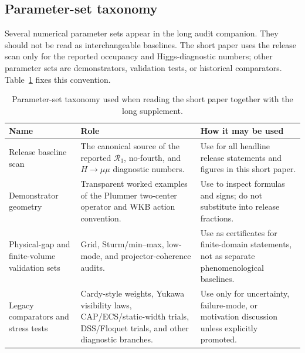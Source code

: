 \documentclass[aps,prd,onecolumn,notitlepage,nofootinbib,superscriptaddress,11pt,floatfix]{revtex4-2}
\newcommand{\Rthree}{\mathcal{R}_3}
\begin{document}
\subsection{Parameter-set taxonomy}

Several numerical parameter sets appear in the long audit companion.
They should not be read as interchangeable baselines.
The short paper uses the release scan only for the reported occupancy and Higgs-diagnostic numbers; other parameter sets are demonstrators, validation tests, or historical comparators.
Table~\ref{tab:param_taxonomy} fixes this convention.

\begin{table}[htbp]
\centering
\caption{Parameter-set taxonomy used when reading the short paper together with the long supplement.}
\label{tab:param_taxonomy}
\small
\setlength{\tabcolsep}{4pt}
\renewcommand{\arraystretch}{1.12}
\begin{tabular}{@{}l l l@{}}
\toprule
\parbox[t]{0.22\textwidth}{\textbf{Name}} & \parbox[t]{0.34\textwidth}{\textbf{Role}} & \parbox[t]{0.32\textwidth}{\textbf{How it may be used}} \\
\midrule
\parbox[t]{0.22\textwidth}{Release baseline scan} &
\parbox[t]{0.34\textwidth}{The canonical source of the reported \(\Rthree\), no-fourth, and \(H\to\mu\mu\) diagnostic numbers.} &
\parbox[t]{0.32\textwidth}{Use for all headline release statements and figures in this short paper.} \\
\parbox[t]{0.22\textwidth}{Demonstrator geometry} &
\parbox[t]{0.34\textwidth}{Transparent worked examples of the Plummer two-center operator and WKB action convention.} &
\parbox[t]{0.32\textwidth}{Use to inspect formulas and signs; do not substitute into release fractions.} \\
\parbox[t]{0.22\textwidth}{Physical-gap and finite-volume validation sets} &
\parbox[t]{0.34\textwidth}{Grid, Sturm/min--max, low-mode, and projector-coherence audits.} &
\parbox[t]{0.32\textwidth}{Use as certificates for finite-domain statements, not as separate phenomenological baselines.} \\
\parbox[t]{0.22\textwidth}{Legacy comparators and stress tests} &
\parbox[t]{0.34\textwidth}{Cardy-style weights, Yukawa visibility laws, CAP/ECS/static-width trials, DSS/Floquet trials, and other diagnostic branches.} &
\parbox[t]{0.32\textwidth}{Use only for uncertainty, failure-mode, or motivation discussion unless explicitly promoted.} \\
\bottomrule
\end{tabular}
\end{table}
\end{document}
